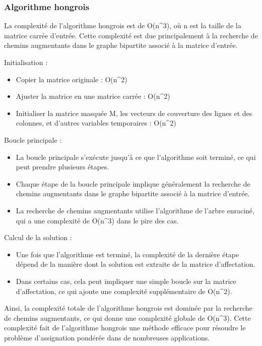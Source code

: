 \documentclass[
]{article}
\providecommand{\tightlist}{%
  \setlength{\itemsep}{0pt}\setlength{\parskip}{0pt}}
\begin{document}
\hypertarget{algorithme-hongrois}{%
\subsubsection{Algorithme hongrois}\label{algorithme-hongrois}}

La complexité de l'algorithme hongrois est de O(n\^{}3), où n est la
taille de la matrice carrée d'entrée. Cette complexité est due
principalement à la recherche de chemins augmentants dans le graphe
bipartite associé à la matrice d'entrée.

Initialisation :

\begin{itemize}
\tightlist
\item
  Copier la matrice originale : O(n\^{}2)
\item
  Ajuster la matrice en une matrice carrée : O(n\^{}2)
\item
  Initialiser la matrice masquée M, les vecteurs de couverture des
  lignes et des colonnes, et d'autres variables temporaires : O(n\^{}2)
\end{itemize}

Boucle principale :

\begin{itemize}
\tightlist
\item
  La boucle principale s'exécute jusqu'à ce que l'algorithme soit
  terminé, ce qui peut prendre plusieurs étapes.
\item
  Chaque étape de la boucle principale implique généralement la
  recherche de chemins augmentants dans le graphe bipartite associé à la
  matrice d'entrée.
\item
  La recherche de chemins augmentants utilise l'algorithme de l'arbre
  enraciné, qui a une complexité de O(n\^{}3) dans le pire des cas.
\end{itemize}

Calcul de la solution :

\begin{itemize}
\tightlist
\item
  Une fois que l'algorithme est terminé, la complexité de la dernière
  étape dépend de la manière dont la solution est extraite de la matrice
  d'affectation.
\item
  Dans certains cas, cela peut impliquer une simple boucle sur la
  matrice d'affectation, ce qui ajoute une complexité supplémentaire de
  O(n\^{}2).
\end{itemize}

Ainsi, la complexité totale de l'algorithme hongrois est dominée par la
recherche de chemins augmentants, ce qui donne une complexité globale de
O(n\^{}3). Cette complexité fait de l'algorithme hongrois une méthode
efficace pour résoudre le problème d'assignation pondérée dans de
nombreuses applications.
\end{document}
